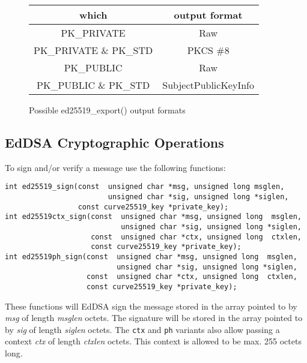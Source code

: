 \documentclass[synpaper]{book}
\begin{document}
\begin{figure}[H]
\begin{center}
\begin{tabular}{|c|c|}
\hline \textbf{which} & \textbf{output format} \\
\hline PK\_PRIVATE & Raw \\
\hline PK\_PRIVATE \& PK\_STD & PKCS \#8 \\
\hline PK\_PUBLIC & Raw \\
\hline PK\_PUBLIC \& PK\_STD & SubjectPublicKeyInfo \\
\hline
\end{tabular}
\end{center}
\caption{Possible ed25519\_export() output formats}
\end{figure}

\subsection{EdDSA Cryptographic Operations}

To sign and/or verify a message use the following functions:

\begin{verbatim}
int ed25519_sign(const  unsigned char *msg, unsigned long msglen,
                        unsigned char *sig, unsigned long *siglen,
                 const curve25519_key *private_key);
int ed25519ctx_sign(const  unsigned char *msg, unsigned long  msglen,
                           unsigned char *sig, unsigned long *siglen,
                    const  unsigned char *ctx, unsigned long  ctxlen,
                    const curve25519_key *private_key);
int ed25519ph_sign(const  unsigned char *msg, unsigned long  msglen,
                          unsigned char *sig, unsigned long *siglen,
                   const  unsigned char *ctx, unsigned long  ctxlen,
                   const curve25519_key *private_key);
\end{verbatim}

These functions will EdDSA sign the message stored in the array pointed to by \textit{msg} of length \textit{msglen} octets.  The signature
will be stored in the array pointed to by \textit{sig} of length \textit{siglen} octets.  The \texttt{ctx} and \texttt{ph} variants also
allow passing a context \textit{ctx} of length \textit{ctxlen} octets.  This context is allowed to be max. 255 octets long.
\end{document}
